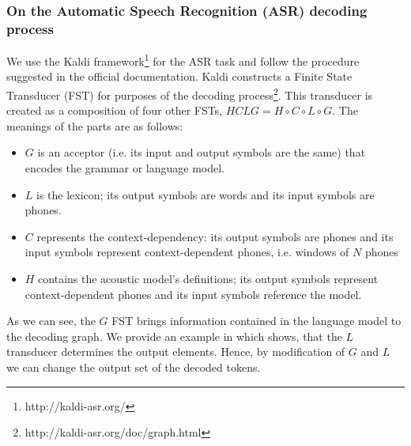 \subsubsection{On the Automatic Speech Recognition (ASR) decoding process}
\label{asr-decoding}
We use the Kaldi framework\footnote{http://kaldi-asr.org/} for the ASR task and follow the procedure suggested in the official documentation.
Kaldi constructs a Finite State Transducer (FST) for purposes of the decoding process\footnote{http://kaldi-asr.org/doc/graph.html}.
This transducer is created as a composition of four other FSTs, $HCLG = H \circ C \circ L \circ G$.
The meanings of the parts are as follows:
\begin{itemize}
\item $G$ is an acceptor (i.e. its input and output symbols are the same) that encodes the grammar or language model.
\item $L$ is the lexicon; its output symbols are words and its input symbols are phones.
\item $C$ represents the context-dependency: its output symbols are phones and its input symbols represent context-dependent phones, i.e. windows of $N$ phones
\item $H$ contains the acoustic model's definitions; its output symbols represent context-dependent phones and its input symbols reference the model.
\end{itemize}
As we can see, the $G$ FST brings information contained in the language model to the decoding graph.
We provide an example in  which shows, that the $L$ transducer determines the output elements.
Hence, by modification of $G$ and $L$ we can change the output set of the decoded tokens.
